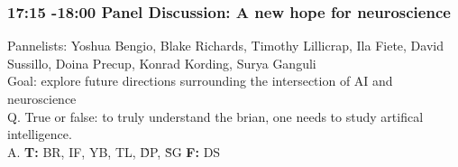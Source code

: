 \documentclass[12pt]{article}
\begin{document}
\subsubsection{17:15 -18:00 Panel Discussion: A new hope for neuroscience}

Pannelists: Yoshua Bengio, Blake Richards, Timothy Lillicrap,  Ila Fiete, David Sussillo, Doina Precup, Konrad Kording, Surya Ganguli \\

Goal: explore future directions surrounding the intersection of AI and neuroscience \\

Q. True or false: to truly understand the brian, one needs to study artifical intelligence.  \\

A. \textbf{T: } BR, IF, YB, TL, \~DP, \~SG \textbf{F: }DS \\



\end{document}
